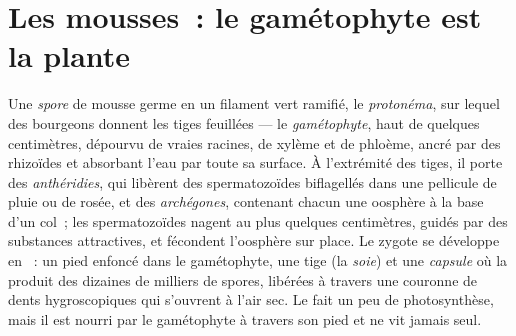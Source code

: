 \section{Les mousses~: le gamétophyte est la plante}

\begin{definition}\label{def:b2:plant-life-cycles:moss}
Une \emph{spore} de mousse germe en un filament vert ramifié, le
\emph{protonéma}, sur lequel des bourgeons donnent les tiges feuillées
--- le \emph{gamétophyte}, haut de quelques centimètres, dépourvu de
vraies racines, de xylème et de phloème, ancré par des rhizoïdes et
absorbant l'eau par toute sa surface. À l'extrémité des tiges, il porte
des \emph{anthéridies}, qui libèrent des spermatozoïdes biflagellés dans
une pellicule de pluie ou de rosée, et des \emph{archégones}, contenant
chacun une oosphère à la base d'un col~; les spermatozoïdes nagent au
plus quelques centimètres, guidés par des substances attractives, et
fécondent l'oosphère sur place. Le zygote se développe en
\emph{}~: un pied enfoncé dans le gamétophyte, une tige
(la \emph{soie}) et une \emph{capsule} où la  produit des dizaines
de milliers de spores, libérées à travers une couronne de dents
hygroscopiques qui s'ouvrent à l'air sec. Le  fait un peu de
photosynthèse, mais il est nourri par le gamétophyte à travers son pied
et ne vit jamais seul.
\end{definition}

